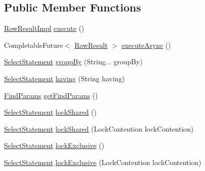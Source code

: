\subsection*{Public Member Functions}
\begin{DoxyCompactItemize}
\item 
\mbox{\hyperlink{classcom_1_1mysql_1_1cj_1_1xdevapi_1_1_row_result_impl}{Row\+Result\+Impl}} \mbox{\hyperlink{classcom_1_1mysql_1_1cj_1_1xdevapi_1_1_select_statement_impl_abb681a3ede027c26d58b25f065a9a9e5}{execute}} ()
\item 
Completable\+Future$<$ \mbox{\hyperlink{interfacecom_1_1mysql_1_1cj_1_1xdevapi_1_1_row_result}{Row\+Result}} $>$ \mbox{\hyperlink{classcom_1_1mysql_1_1cj_1_1xdevapi_1_1_select_statement_impl_a8350a43b44c31858c02fcbc4f90f15ee}{execute\+Async}} ()
\item 
\mbox{\hyperlink{interfacecom_1_1mysql_1_1cj_1_1xdevapi_1_1_select_statement}{Select\+Statement}} \mbox{\hyperlink{classcom_1_1mysql_1_1cj_1_1xdevapi_1_1_select_statement_impl_a88dd14474574f8e6f785aa2341b7c382}{group\+By}} (String... group\+By)
\item 
\mbox{\hyperlink{interfacecom_1_1mysql_1_1cj_1_1xdevapi_1_1_select_statement}{Select\+Statement}} \mbox{\hyperlink{classcom_1_1mysql_1_1cj_1_1xdevapi_1_1_select_statement_impl_a7c95308255a21648ee6bbe698e934552}{having}} (String having)
\item 
\mbox{\hyperlink{interfacecom_1_1mysql_1_1cj_1_1xdevapi_1_1_find_params}{Find\+Params}} \mbox{\hyperlink{classcom_1_1mysql_1_1cj_1_1xdevapi_1_1_select_statement_impl_a887ea3a5dcdb37d2bc6845cfc67631a9}{get\+Find\+Params}} ()
\item 
\mbox{\hyperlink{interfacecom_1_1mysql_1_1cj_1_1xdevapi_1_1_select_statement}{Select\+Statement}} \mbox{\hyperlink{classcom_1_1mysql_1_1cj_1_1xdevapi_1_1_select_statement_impl_a4c2746728bcf0ed59e1604d57f94f8b2}{lock\+Shared}} ()
\item 
\mbox{\hyperlink{interfacecom_1_1mysql_1_1cj_1_1xdevapi_1_1_select_statement}{Select\+Statement}} \mbox{\hyperlink{classcom_1_1mysql_1_1cj_1_1xdevapi_1_1_select_statement_impl_a94383dd2bc539f35e3faa4de023248a1}{lock\+Shared}} (Lock\+Contention lock\+Contention)
\item 
\mbox{\hyperlink{interfacecom_1_1mysql_1_1cj_1_1xdevapi_1_1_select_statement}{Select\+Statement}} \mbox{\hyperlink{classcom_1_1mysql_1_1cj_1_1xdevapi_1_1_select_statement_impl_a53aaa86b0305024bdd172a02e975b006}{lock\+Exclusive}} ()
\item 
\mbox{\hyperlink{interfacecom_1_1mysql_1_1cj_1_1xdevapi_1_1_select_statement}{Select\+Statement}} \mbox{\hyperlink{classcom_1_1mysql_1_1cj_1_1xdevapi_1_1_select_statement_impl_afbaa870747c558133a85fcc536658503}{lock\+Exclusive}} (Lock\+Contention lock\+Contention)
\end{DoxyCompactItemize}
